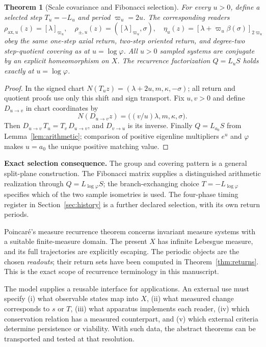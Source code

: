 \documentclass[10pt,letterpaper]{article}
\newtheorem{theorem}{Theorem}[section]
\theoremstyle{definition}\newtheorem{definition}[theorem]{Definition}
\newcommand{\ph}{\varphi}
\newcommand{\varp}{\varpi}
\begin{document}
\begin{theorem}[Scale covariance and Fibonacci selection]\label{thm:scale}
For every $u>0$, define a selected step $T_u=-L_u$ and period $\varp_u=2u$. The corresponding readers
\begin{equation}
 \rho_{\mathrm{ax},u}(z)=[\lambda]_{\varp_u},\quad
 \rho_{\pm,u}(z)=([\lambda]_{\varp_u},\sigma),\quad
 \eta_u(z)=[\lambda+\varp_u\beta(\sigma)]_{2\varp_u}
\end{equation}
obey the same one-step axial return, two-step oriented return, and degree-two step-quotient covering as at $u=\log\ph$. All $u>0$ sampled systems are conjugate by an explicit homeomorphism on $X$. The recurrence factorization $Q=L_u S$ holds exactly at $u=\log\ph$.
\end{theorem}
\begin{proof}
In the signed chart $N(T_u z)=(\lambda+2u,m,\kappa,-\sigma)$; all return and quotient proofs use only this shift and sign transport. Fix $u,v>0$ and define $D_{u\to v}$ in chart coordinates by
\begin{equation}
 N(D_{u\to v}z)=\bigl((v/u)\lambda,m,\kappa,\sigma\bigr).
\end{equation}
Then $D_{u\to v}\,T_u=T_v\,D_{u\to v}$, and $D_{v\to u}$ is its inverse. Finally $Q=L_{a_0}S$ from Lemma~\ref{lem:arithmetic}; comparison of positive eigenline multipliers $e^u$ and $\ph$ makes $u=a_0$ the unique positive matching value.
\end{proof}

\textbf{Exact selection consequence.} The group and covering pattern is a general split-plane construction. The Fibonacci matrix supplies a distinguished arithmetic realization through $Q=L_{\log\ph}S$; the branch-exchanging choice $T=-L_{\log\ph}$ specifies which of the two sample isometries is used. The four-phase timing register in Section~\ref{sec:history} is a further declared selection, with its own return periods.

Poincar\'e's measure recurrence theorem concerns invariant measure systems with a suitable finite-measure domain. The present $X$ has infinite Lebesgue measure, and its full trajectories are explicitly escaping. The periodic objects are the chosen \emph{readouts}; their return sets have been computed in Theorem~\ref{thm:returns}. This is the exact scope of recurrence terminology in this manuscript.

The model supplies a reusable interface for applications. An external use must specify (i) what observable states map into $X$, (ii) what measured change corresponds to $s$ or $T$, (iii) what apparatus implements each reader, (iv) which conservation relation has a measured counterpart, and (v) which external criteria determine persistence or viability. With such data, the abstract theorems can be transported and tested at that resolution.
\end{document}
